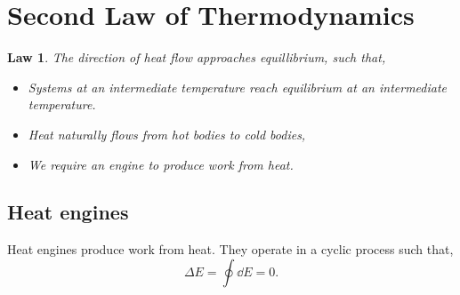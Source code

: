 \documentclass{book}
\newtheorem{law}{Law}
\begin{document}
\section{Second Law of Thermodynamics}
\begin{law}
	The direction of heat flow approaches equillibrium, such that,
	\begin{itemize}
		\item Systems at an intermediate temperature reach equilibrium at an intermediate temperature.
		\item Heat naturally flows from hot bodies to cold bodies,
		\item We require an engine to produce work from heat.
	\end{itemize}
\end{law}
\subsection{Heat engines}

Heat engines produce work from heat. They operate in a cyclic process such that,
\begin{equation}
	\Delta E = \oint\dd{E} = 0.
\end{equation}
\end{document}
